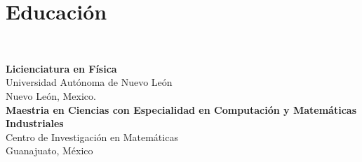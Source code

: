 \documentclass[a3paper]{adcv_color}
\begin{document}
\begin{addmargin}[0.5em]{0.5em}


\end{addmargin}
\begin{minipage}{0.35\linewidth}
	\section{Educación}\\
	\begin{addmargin}[0.5em]{0.5em}
		\textbf{Licienciatura en Física} \\
		Universidad Autónoma de Nuevo León\\
		Nuevo León, Mexico.\\

		\textbf{Maestria en Ciencias con Especialidad en Computación y Matemáticas Industriales}\\
		Centro de Investigación en Matemáticas\\
		Guanajuato, México
	\end{addmargin}
\end{minipage}
\end{document}
